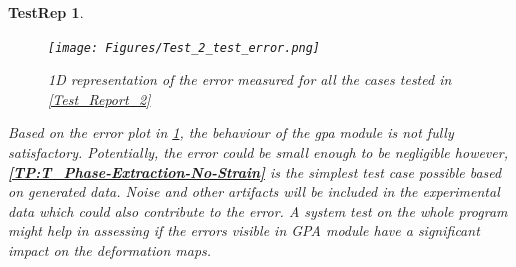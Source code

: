 \documentclass[12pt, titlepage]{article}
\newtheorem{TestRep}{TestRep}
\begin{document}
\begin{TestRep}
\begin{figure}[H]
\begin{center}
\texttt{[image: Figures/Test\_2\_test\_error.png]}
\caption{1D representation of the error measured for all the cases tested in \cref{Test_Report_2}}
\label{fig:Test_2_Test_error}
\end{center}
\end{figure}

Based on the error plot in \cref{fig:Test_2_Test_error}, the behaviour of the gpa module is not fully satisfactory. Potentially, the error could be small enough to be negligible however, \textbf{\cref{TP:T_Phase-Extraction-No-Strain}} is the simplest test case possible based on generated data. Noise and other artifacts will be included in the experimental data which could also contribute to the error. A system test on the whole program might help in assessing if the errors visible in GPA module have a significant impact on the deformation maps. \bigskip
\end{TestRep}
\end{document}
